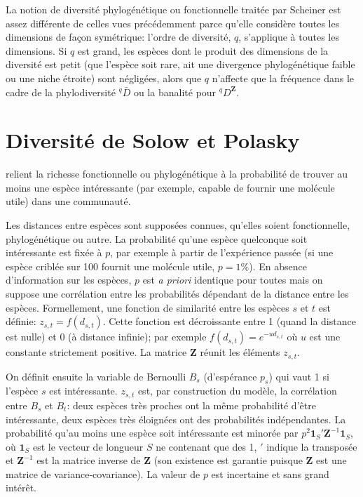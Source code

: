 \documentclass[
  11pt,
  french,
  a4paper,
  extrafontsizes,onecolumn,openright
  ]{memoir}
\begin{document}
\normalsize

La notion de diversité phylogénétique ou fonctionnelle traitée par Scheiner est assez différente de celles vues précédemment parce qu'elle considère toutes les dimensions de façon symétrique: l'ordre de diversité, \(q\), s'applique à toutes les dimensions.
Si \(q\) est grand, les espèces dont le produit des dimensions de la diversité est petit (que l'espèce soit rare, ait une divergence phylogénétique faible ou une niche étroite) sont négligées, alors que \(q\) n'affecte que la fréquence dans le cadre de la phylodiversité \(^{q}\!\bar{D}\) ou la banalité pour \(^q\!D^{\mathbf{Z}}\).

\section{Diversité de Solow et Polasky}\label{diversituxe9-de-solow-et-polasky}

\textcite{Solow1994} relient la richesse fonctionnelle ou phylogénétique à la probabilité de trouver au moins une espèce intéressante (par exemple, capable de fournir une molécule utile) dans une communauté.

Les distances entre espèces sont supposées connues, qu'elles soient fonctionnelle, phylogénétique ou autre.
La probabilité qu'une espèce quelconque soit intéressante est fixée à \(p\), par exemple à partir de l'expérience passée (si une espèce criblée sur 100 fournit une molécule utile, \(p=1\%\)).
En absence d'information sur les espèces, \(p\) est \emph{a priori} identique pour toutes mais on suppose une corrélation entre les probabilités dépendant de la distance entre les espèces.
Formellement, une fonction de similarité entre les espèces \(s\) et \(t\) est définie: \(z_{s,t}=f(d_{s,t})\).
Cette fonction est décroissante entre 1 (quand la distance est nulle) et 0 (à distance infinie); par exemple \(f(d_{s,t}) = e^{-u d_{s,t}}\) où \(u\) est une constante strictement positive.
La matrice \(\mathbf{Z}\) réunit les éléments \(z_{s,t}\).

On définit ensuite la variable de Bernoulli \(B_s\) (d'espérance \(p_s\)) qui vaut 1 si l'espèce \(s\) est intéressante.
\(z_{s,t}\) est, par construction du modèle, la corrélation entre \(B_s\) et \(B_t\): deux espèces très proches ont la même probabilité d'être intéressante, deux espèces très éloignées ont des probabilités indépendantes.
La probabilité qu'au moins une espèce soit intéressante est minorée par \(p^2 \mathbf{1}_S' \mathbf{Z}^{-1} \mathbf{1}_S\), où \(\mathbf{1}_S\) est le vecteur de longueur \(S\) ne contenant que des 1, \('\) indique la transposée et \(\mathbf{Z}^{-1}\) est la matrice inverse de \(\mathbf{Z}\) (son existence est garantie puisque \(\mathbf{Z}\) est une matrice de variance-covariance).
La valeur de \(p\) est incertaine et sans grand intérêt.
\end{document}
